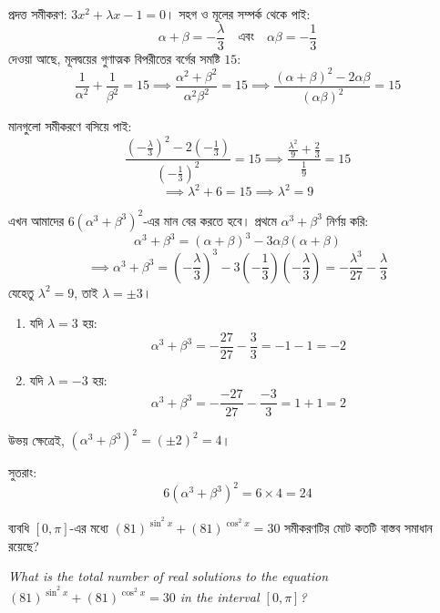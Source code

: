 \documentclass[12pt, a4paper]{article}
\begin{document}
\begin{tcolorbox}[solutionbox={সমাধান (Solution)}]
    \noindent
    প্রদত্ত সমীকরণ: $3x^2 + \lambda x - 1 = 0$। 
    সহগ ও মূলের সম্পর্ক থেকে পাই:
    \[ \alpha+\beta = -\frac{\lambda}{3} \quad \text{এবং} \quad \alpha\beta = -\frac{1}{3} \]
    দেওয়া আছে, মূলদ্বয়ের গুণাত্মক বিপরীতের বর্গের সমষ্টি $15$:
    \[ \frac{1}{\alpha^2} + \frac{1}{\beta^2} = 15 \implies \frac{\alpha^2+\beta^2}{\alpha^2\beta^2} = 15 \implies \frac{(\alpha+\beta)^2 - 2\alpha\beta}{(\alpha\beta)^2} = 15 \]
    
    \vspace{0.5em}
    মানগুলো সমীকরণে বসিয়ে পাই:
    \[ \frac{\left(-\frac{\lambda}{3}\right)^2 - 2\left(-\frac{1}{3}\right)}{\left(-\frac{1}{3}\right)^2} = 15 \implies \frac{\frac{\lambda^2}{9} + \frac{2}{3}}{\frac{1}{9}} = 15 \]
    \[ \implies \lambda^2 + 6 = 15 \implies \lambda^2 = 9 \]
    
    \vspace{0.5em}
    এখন আমাদের $6(\alpha^3 + \beta^3)^2$-এর মান বের করতে হবে। প্রথমে $\alpha^3 + \beta^3$ নির্ণয় করি:
    \[ \alpha^3 + \beta^3 = (\alpha+\beta)^3 - 3\alpha\beta(\alpha+\beta) \]
    \[ \implies \alpha^3 + \beta^3 = \left(-\frac{\lambda}{3}\right)^3 - 3\left(-\frac{1}{3}\right)\left(-\frac{\lambda}{3}\right) = -\frac{\lambda^3}{27} - \frac{\lambda}{3} \]
    যেহেতু $\lambda^2 = 9$, তাই $\lambda = \pm 3$।
    \begin{enumerate}[itemsep=0.3em]
        \item যদি $\lambda = 3$ হয়: 
        \[ \alpha^3 + \beta^3 = -\frac{27}{27} - \frac{3}{3} = -1 - 1 = -2 \]
        \item যদি $\lambda = -3$ হয়: 
        \[ \alpha^3 + \beta^3 = -\frac{-27}{27} - \frac{-3}{3} = 1 + 1 = 2 \]
    \end{enumerate}
    উভয় ক্ষেত্রেই, $(\alpha^3 + \beta^3)^2 = (\pm 2)^2 = 4$। 
    
    \vspace{0.5em}
    সুতরাং:
    \[ 6(\alpha^3 + \beta^3)^2 = 6 \times 4 = 24 \]
\end{tcolorbox}
\begin{tcolorbox}[questionbox={প্রশ্ন (Question) 40}]
    \noindent
    ব্যবধি $[0, \pi]$-এর মধ্যে $(81)^{\sin^2 x} + (81)^{\cos^2 x} = 30$ সমীকরণটির মোট কতটি বাস্তব সমাধান রয়েছে?
    
    \vspace{0.8em}
    \begin{english}
    \noindent\textit{\color{darkgray}
    What is the total number of real solutions to the equation $(81)^{\sin^2 x} + (81)^{\cos^2 x} = 30$ in the interval $[0, \pi]$?
    }
    \end{english}
\end{tcolorbox}
\end{document}
